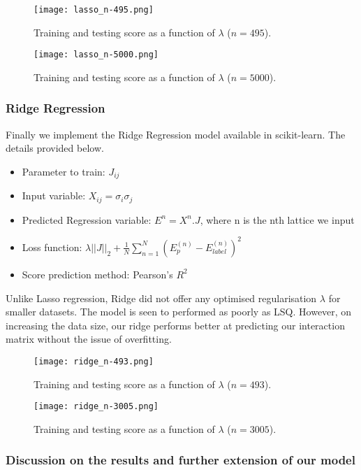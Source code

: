 \begin{figure}[h!]
    \centering
    \texttt{[image: lasso\_n-495.png]}
    \caption{Training and testing score as a function of \( \lambda \) (\( n=495 \)).}
\end{figure}


\begin{figure}[h!]
    \centering
    \texttt{[image: lasso\_n-5000.png]}
    \caption{Training and testing score as a function of \( \lambda \) (\( n=5000 \)).}
\end{figure}


\subsubsection{Ridge Regression}
Finally we implement the Ridge Regression model available in scikit-learn. The details provided below.
\begin{itemize}
    \item Parameter to train: \(J_{ij}\)
    \item Input variable: \(X_{ij}=\sigma_i\sigma_j\)
    \item Predicted Regression variable: \(E^n=X^n.J\), where n is the nth lattice we input
    \item Loss function: \(\lambda ||J||_2 + \frac{1}{N} \sum_{n=1}^N(E_p^{(n)}-E_{label}^{(n)})^2\)
    \item Score prediction method: Pearson's \(R^2\)
\end{itemize}

Unlike Lasso regression, Ridge did not offer any optimised regularisation \(\lambda\) for smaller datasets.
The model is seen to performed as poorly as LSQ.
However, on increasing the data size, our ridge performs better at predicting our interaction matrix without the issue of overfitting.

\begin{figure}[h!]
    \centering
    \texttt{[image: ridge\_n-493.png]}
    \caption{Training and testing score as a function of \( \lambda \) (\( n=493 \)).}
\end{figure}

\begin{figure}[h!]
    \centering
    \texttt{[image: ridge\_n-3005.png]}
    \caption{Training and testing score as a function of \( \lambda \) (\( n=3005 \)).}
\end{figure}



\subsubsection{Discussion on the results and further extension of our model}

